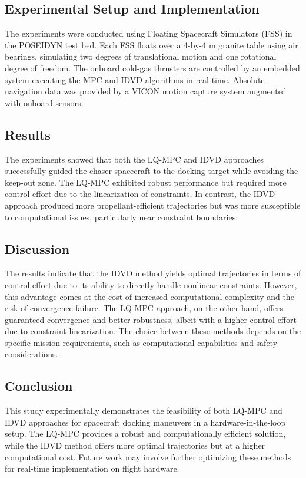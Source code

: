 \documentclass[a4paper,12pt]{article}
\begin{document}
\subsection{Experimental Setup and Implementation}
The experiments were conducted using Floating Spacecraft Simulators (FSS) in the POSEIDYN test bed. Each FSS floats over a 4-by-4 m granite table using air bearings, simulating two degrees of translational motion and one rotational degree of freedom. The onboard cold-gas thrusters are controlled by an embedded system executing the MPC and IDVD algorithms in real-time. Absolute navigation data was provided by a VICON motion capture system augmented with onboard sensors.

\subsection{Results}
The experiments showed that both the LQ-MPC and IDVD approaches successfully guided the chaser spacecraft to the docking target while avoiding the keep-out zone. The LQ-MPC exhibited robust performance but required more control effort due to the linearization of constraints. In contrast, the IDVD approach produced more propellant-efficient trajectories but was more susceptible to computational issues, particularly near constraint boundaries.

\subsection{Discussion}
The results indicate that the IDVD method yields optimal trajectories in terms of control effort due to its ability to directly handle nonlinear constraints. However, this advantage comes at the cost of increased computational complexity and the risk of convergence failure. The LQ-MPC approach, on the other hand, offers guaranteed convergence and better robustness, albeit with a higher control effort due to constraint linearization. The choice between these methods depends on the specific mission requirements, such as computational capabilities and safety considerations.

\subsection{Conclusion}
This study experimentally demonstrates the feasibility of both LQ-MPC and IDVD approaches for spacecraft docking maneuvers in a hardware-in-the-loop setup. The LQ-MPC provides a robust and computationally efficient solution, while the IDVD method offers more optimal trajectories but at a higher computational cost. Future work may involve further optimizing these methods for real-time implementation on flight hardware.
\end{document}
